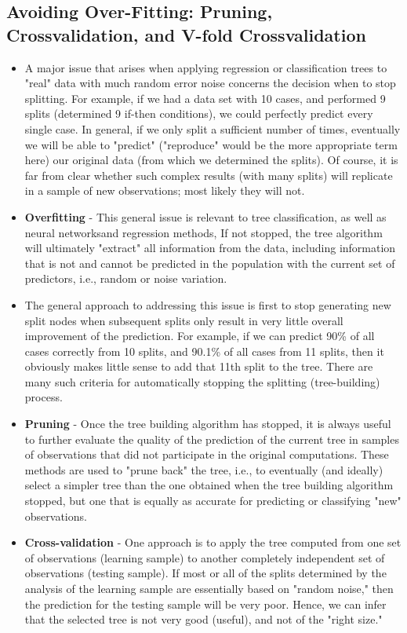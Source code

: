 \documentclass[caret-main.tex]{subfiles}
\begin{document}
\subsection{Avoiding Over-Fitting: Pruning, Crossvalidation, and V-fold Crossvalidation}
\begin{itemize}
\item A major issue that arises when applying regression or classification trees to "real" data with much random error noise concerns the decision when to stop splitting. For example, if we had a data set with 10 cases, and performed 9 splits (determined 9 if-then conditions), we could perfectly predict every single case. In general, if we only split a sufficient number of times, eventually we will be able to "predict" ("reproduce" would be the more appropriate term here) our original data (from which we determined the splits). Of course, it is far from clear whether such complex results (with many splits) will replicate in a sample of new observations; most likely they will not.

\item \textbf{Overfitting} -
This general issue is relevant to tree classification, as well as neural networksand regression methods, If not stopped, the tree algorithm will ultimately "extract" all information from the data, including information that is not and cannot be predicted in the population with the current set of predictors, i.e., random or noise variation.
\item The general approach to addressing this issue is first to stop generating new split nodes when subsequent splits only result in very little overall improvement of the prediction. For example, if we can predict 90\% of all cases correctly from 10 splits, and 90.1\% of all cases from 11 splits, then it obviously makes little sense to add that 11th split to the tree. There are many such criteria for automatically stopping the splitting (tree-building) process.

\item \textbf{Pruning} - Once the tree building algorithm has stopped, it is always useful to further evaluate the quality of the prediction of the current tree in samples of observations that did not participate in the original computations. These methods are used to "prune back" the tree, i.e., to eventually (and ideally) select a simpler tree than the one obtained when the tree building algorithm stopped, but one that is equally as accurate for predicting or classifying "new" observations.
\item
\textbf{Cross-validation} -  One approach is to apply the tree computed from one set of observations (learning sample) to another completely independent set of observations (testing sample). If most or all of the splits determined by the analysis of the learning sample are essentially based on "random noise," then the prediction for the testing sample will be very poor. Hence, we can infer that the selected tree is not very good (useful), and not of the "right size."


\end{itemize}
\end{document}
